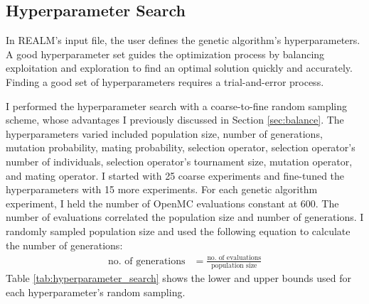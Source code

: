 \subsection{Hyperparameter Search}
\label{sec:hyperparameter_search}
In \gls{REALM}'s input file, the user defines the genetic algorithm's 
hyperparameters. 
A good hyperparameter set guides the optimization process by 
balancing exploitation and exploration to find an optimal solution quickly 
and accurately. 
Finding a good set of hyperparameters requires a trial-and-error process. 

I performed the hyperparameter search with a coarse-to-fine random sampling scheme, 
whose advantages I previously discussed in Section \ref{sec:balance}.
The hyperparameters varied included population size, number of generations, 
mutation probability, mating probability, selection operator, selection operator's 
number of individuals, selection operator's tournament size, mutation operator, 
and mating operator.  
I started with 25 coarse experiments and fine-tuned the hyperparameters
with 15 more experiments. 
For each genetic algorithm experiment, I held the number of OpenMC evaluations 
constant at 600.
The number of evaluations correlated the population size and number of generations. 
I randomly sampled population size and used the following equation to calculate 
the number of generations: 
\begin{align}
    \mbox{no. of generations} &= \frac{\mbox{no. of evaluations}}{\mbox{population size} }
\end{align}
Table \ref{tab:hyperparameter_search} shows the lower and upper bounds used 
for each hyperparameter's random sampling. 
